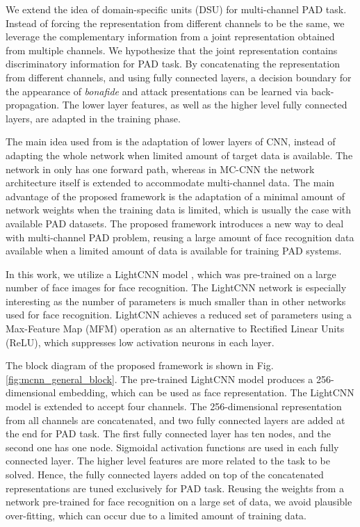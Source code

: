 \documentclass[journal]{IEEEtran}
\begin{document}
We extend the idea of domain-specific units (DSU) for multi-channel PAD task. Instead of forcing the representation from different channels to be the same, we leverage the complementary information from a joint representation obtained from multiple channels. We hypothesize that the joint representation contains discriminatory information for PAD task. By concatenating the representation from different channels, and using fully connected layers, a decision boundary for the appearance of \textit{bonafide} and attack presentations can be learned via back-propagation. The lower layer features, as well as the higher level fully connected layers, are adapted in the training phase.

The main idea used from \cite{freitas2018heterogeneous} is the adaptation of lower layers of CNN, instead of adapting the whole network when limited amount of target data is available. The network in \cite{freitas2018heterogeneous} only has one forward path, whereas in MC-CNN the network architecture itself is extended to accommodate multi-channel data. The main advantage of the proposed framework is the adaptation of a minimal amount of network weights when the training data is limited, which is usually the case with available PAD datasets. The proposed framework introduces a new way to deal with multi-channel PAD problem, reusing a large amount of face recognition data available when a limited amount of data is available for training PAD systems. 

In this work, we utilize a LightCNN model \cite{wu2018light}, which was pre-trained on a large number of face images for face recognition. The LightCNN network is especially interesting as the number of parameters is much smaller than in other networks used for face recognition. LightCNN achieves a reduced set of parameters using a Max-Feature Map (MFM) operation as an alternative to Rectified Linear Units (ReLU), which suppresses low activation neurons in each layer.

The block diagram of the proposed framework is shown in Fig. \ref{fig:mcnn_general_block}. The pre-trained LightCNN model produces a 256-dimensional embedding, which can be used as face representation. The LightCNN model is extended to accept four channels. The 256-dimensional representation from all channels are concatenated, and two fully connected layers are added at the end for PAD task. The first fully connected layer has ten nodes, and the second one has one node. Sigmoidal activation functions are used in each fully connected layer. The higher level features are more related to the task to be solved. Hence, the fully connected layers added on top of the concatenated representations are tuned exclusively for PAD task. Reusing the weights from a network pre-trained for face recognition on a large set of data, we avoid plausible over-fitting, which can occur due to a limited amount of training data.
\end{document}
